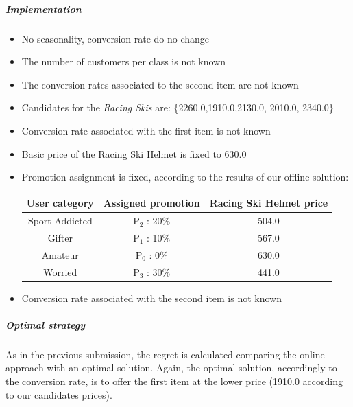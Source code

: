 \subparagraph{Implementation} 
\begin{itemize}
	\item No seasonality, conversion rate do no change
	\item The number of customers per class is not known
	\item The conversion rates associated to the second item are not known
	\item Candidates for the \textit{Racing Skis} are: \{2260.0,1910.0,2130.0, 2010.0, 2340.0\}
	\item Conversion rate associated with the first item is not known
	\item Basic price of the Racing Ski Helmet is fixed to 630.0
	\item Promotion assignment is fixed, according to the results of our offline solution: 
	\begin{center}
		\begin{tabular}{ |c|c|c|} 
		\hline
		User category & Assigned promotion & Racing Ski Helmet price \\
		\hline
		Sport Addicted & P$_2$ : 20\% & 504.0 \\
		\hline
		Gifter & P$_1$ : 10\% & 567.0 \\
		\hline
		Amateur & P$_0$ : 0\% & 630.0 \\
		\hline
		Worried & P$_3$ : 30\% & 441.0 \\
		\hline
		\end{tabular}
	\end{center}
	\item Conversion rate associated with the second item is not known
\end{itemize}
\subparagraph{Optimal strategy}
As in the previous submission, the regret is calculated comparing the online approach with an optimal solution. Again, the optimal solution, accordingly to the conversion rate, is to offer the first item at the lower price (1910.0 according to our candidates prices). 

